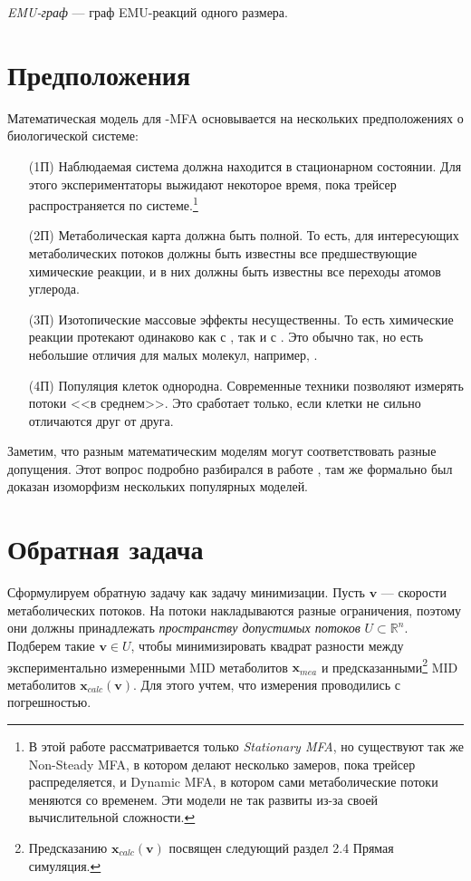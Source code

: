 \documentclass[14pt, a4paper]{extreport}
\begin{document}
\hangindent=1cm \noindent
\emph{EMU-граф} --- граф EMU-реакций одного размера.



\clearpage

\section{Предположения}
Математическая модель для -MFA основывается на нескольких предположениях о биологической системе\cite{Wiechert_1997_1}:
\begin{enumerate}
	\item[(1П)] Наблюдаемая система должна находится в стационарном состоянии. Для этого экспериментаторы выжидают некоторое время, пока трейсер распространяется по системе.\footnote{В этой работе рассматривается только \emph{Stationary MFA}, но существуют так же Non-Steady MFA\cite{NMFA}, в котором делают несколько замеров, пока трейсер распределяется, и Dynamic MFA\cite{DMFA}, в котором сами метаболические потоки меняются со временем. Эти модели не так развиты из-за своей вычислительной сложности.}
	
	\item[(2П)] Метаболическая карта должна быть полной. То есть, для интересующих метаболических потоков должны быть известны все предшествующие химические реакции, и в них должны быть известны все переходы атомов углерода.
	
	\item[(3П)] Изотопические массовые эффекты несущественны. То есть химические реакции протекают одинаково как с , так и с . Это обычно так, но есть небольшие отличия для малых молекул, например, .
	
	\item[(4П)] Популяция клеток однородна. Современные техники позволяют измерять потоки <<в среднем>>. Это сработает только, если клетки не сильно отличаются друг от друга.
\end{enumerate}

Заметим, что разным математическим моделям могут соответствовать разные допущения. Этот вопрос подробно разбирался в работе \cite{formalizm_2017}, там же формально был доказан изоморфизм нескольких популярных моделей.
\clearpage


\section{Обратная задача}

Сформулируем обратную задачу как задачу минимизации. Пусть $\mathbf{v}$ --- скорости метаболических потоков. На потоки накладываются разные ограничения, поэтому они должны принадлежать \emph{пространству допустимых потоков} $U \subset \mathbb{R}^n$. Подберем такие $\mathbf{v} \in U$, чтобы минимизировать квадрат разности между экспериментально измеренными MID метаболитов $\mathbf{x}_{mea}$ и предсказанными\footnote{Предсказанию $\mathbf{x}_{calc}(\mathbf{v})$ посвящен следующий раздел 2.4 Прямая симуляция.} MID метаболитов $\mathbf{x}_{calc}(\mathbf{v})$. Для этого учтем, что измерения проводились с погрешностью. 
\end{document}
